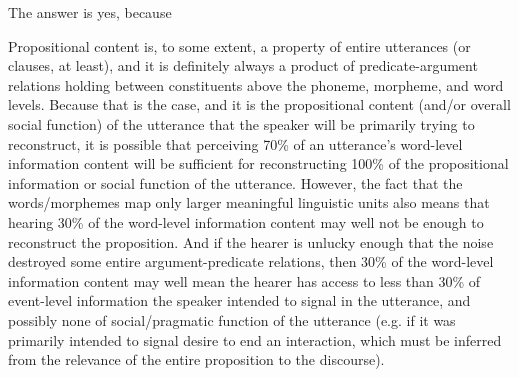 \documentclass[12pt]{article}
\begin{document}
The answer is yes, because %

Propositional content is, to some extent, a property of entire utterances (or clauses, at least), and it is definitely always a product of predicate-argument relations holding between constituents above the phoneme, morpheme, and word levels. Because that is the case, and it is the propositional content (and/or overall social function) of the utterance that the speaker will be primarily trying to reconstruct, it is possible that perceiving 70\% of an utterance's word-level information content will be sufficient for reconstructing 100\% of the propositional information or social function of the utterance. However, the fact that the words/morphemes map only larger meaningful linguistic units also means that hearing 30\% of the word-level information content may well not be enough to reconstruct the proposition. And if the hearer is unlucky enough that the noise destroyed some entire argument-predicate relations, then 30\% of the word-level information content may well mean the hearer has access to less than 30\% of event-level information the speaker intended to signal in the utterance, and possibly none of social/pragmatic function of the utterance (e.g. if it was primarily intended to signal desire to end an interaction, which must be inferred from the relevance of the entire proposition to the discourse). 


 
\end{document}
